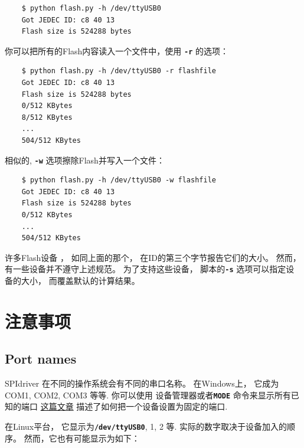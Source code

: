 \documentclass{article}
\newcommand{\mach}[1]{\texttt{\textbf{#1}}}
\begin{document}
\begin{lstlisting}
    $ python flash.py -h /dev/ttyUSB0
    Got JEDEC ID: c8 40 13
    Flash size is 524288 bytes
\end{lstlisting}

你可以把所有的Flash内容读入一个文件中，使用 \mach{-r} 的选项：


\begin{lstlisting}
    $ python flash.py -h /dev/ttyUSB0 -r flashfile
    Got JEDEC ID: c8 40 13
    Flash size is 524288 bytes
    0/512 KBytes
    8/512 KBytes
    ...
    504/512 KBytes
\end{lstlisting}

相似的, \mach{-w} 选项擦除Flash并写入一个文件： 

\begin{lstlisting}
    $ python flash.py -h /dev/ttyUSB0 -w flashfile
    Got JEDEC ID: c8 40 13
    Flash size is 524288 bytes
    0/512 KBytes
    ...
    504/512 KBytes
\end{lstlisting}


许多Flash设备 ， 如同上面的那个， 在ID的第三个字节报告它们的大小。 
然而， 有一些设备并不遵守上述规范。 
为了支持这些设备， 脚本的\mach{-s} 选项可以指定设备的大小， 而覆盖默认的计算结果。 


% 
% 

\newpage
\section{注意事项}

\subsection{Port names}

SPIdriver 在不同的操作系统会有不同的串口名称。 
在Windows上， 它成为COM1, COM2, COM3 等等.
你可以使用 设备管理器或者\mach{MODE} 命令来显示所有已知的端口
\href{https://plugable.com/2011/07/04/how-to-change-the-com-port-for-a-usb-serial-adapter-on-windows-7/}{这篇文章}
描述了如何把一个设备设置为固定的端口.

在Linux平台， 它显示为\mach{/dev/ttyUSB0}, 1, 2 等.
实际的数字取决于设备加入的顺序。 
然而，它也有可能显示为如下： 
\end{document}
